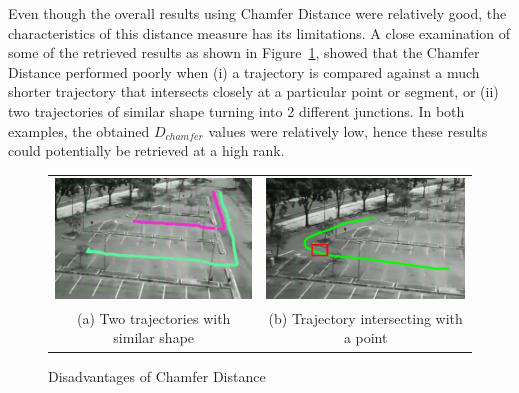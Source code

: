 Even though the overall results using Chamfer Distance were relatively good, the characteristics of this distance measure has its limitations. A close examination of some of the retrieved results as shown in Figure~\ref{fig:chamferDisadvantage}, showed that the Chamfer Distance performed poorly when (i) a trajectory is compared against a much shorter trajectory that intersects closely at a particular point or segment, or (ii) two trajectories of similar shape turning into 2 different junctions. In both examples, the obtained $D_{chamfer}$ values were relatively low, hence these results could potentially be retrieved at a high rank.
\begin{figure}[tb!]
  \centering
\begin{tabular}{cc }
 \includegraphics[width=0.47\linewidth]{image/retrievalTwo/chamferDisadv2.png} &
 \includegraphics[width=0.47\linewidth]{image/retrievalTwo/chamferDisadv1.png} \\
 (a) Two trajectories with similar shape &
 (b) Trajectory intersecting with a point \\
\end{tabular}
\caption{Disadvantages of Chamfer Distance} \label{fig:chamferDisadvantage}
\end{figure}

